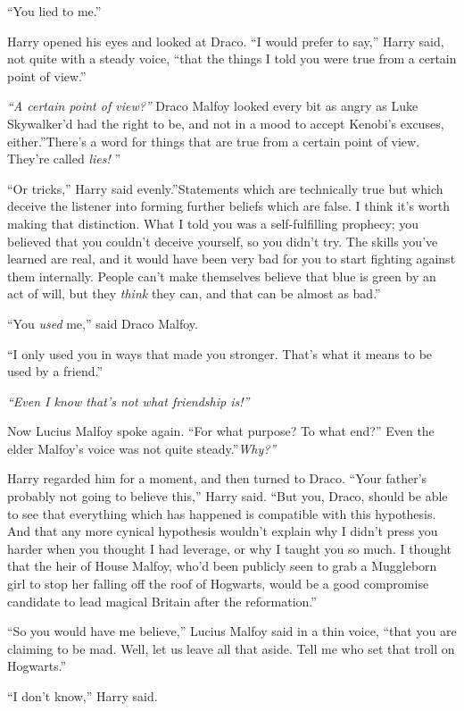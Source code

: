 ``You lied to me.''

Harry opened his eyes and looked at Draco. ``I would prefer to say,''
Harry said, not quite with a steady voice, ``that the things I told you
were true from a certain point of view.''

\emph{``A certain point of view?''} Draco Malfoy looked every bit as
angry as Luke Skywalker'd had the right to be, and not in a mood to
accept Kenobi's excuses, either.''There's a word for things that are
true from a certain point of view. They're called \emph{lies!} ''

``Or tricks,'' Harry said evenly.''Statements which are technically true
but which deceive the listener into forming further beliefs which are
false. I think it's worth making that distinction. What I told you was a
self-fulfilling prophecy; you believed that you couldn't deceive
yourself, so you didn't try. The skills you've learned are real, and it
would have been very bad for you to start fighting against them
internally. People can't make themselves believe that blue is green by
an act of will, but they \emph{think} they can, and that can be almost
as bad.''

``You \emph{used} me,'' said Draco Malfoy.

``I only used you in ways that made you stronger. That's what it means
to be used by a friend.''

\emph{``Even I know that's not what friendship is!''}

Now Lucius Malfoy spoke again. ``For what purpose? To what end?'' Even
the elder Malfoy's voice was not quite steady.''\emph{Why?''}

Harry regarded him for a moment, and then turned to Draco. ``Your
father's probably not going to believe this,'' Harry said. ``But you,
Draco, should be able to see that everything which has happened is
compatible with this hypothesis. And that any more cynical hypothesis
wouldn't explain why I didn't press you harder when you thought I had
leverage, or why I taught you so much. I thought that the heir of House
Malfoy, who'd been publicly seen to grab a Muggleborn girl to stop her
falling off the roof of Hogwarts, would be a good compromise candidate
to lead magical Britain after the reformation.''

``So you would have me believe,'' Lucius Malfoy said in a thin voice,
``that you are claiming to be mad. Well, let us leave all that aside.
Tell me who set that troll on Hogwarts.''

``I don't know,'' Harry said.

